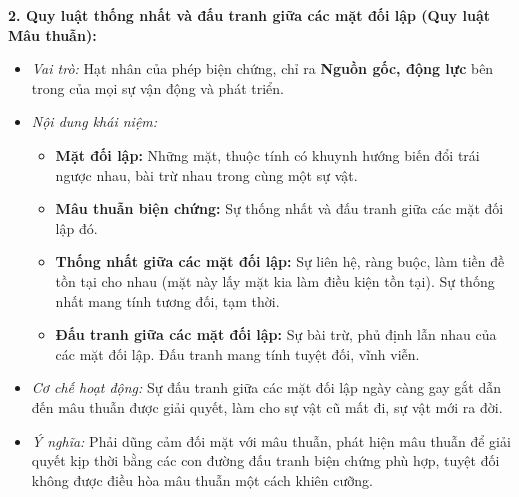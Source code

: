 \documentclass[12pt,a4paper]{article}
\begin{document}
{\noindent
\textbf{2. Quy luật thống nhất và đấu tranh giữa các mặt đối lập (Quy luật Mâu thuẫn):}
\begin{itemize}
    \item \textit{Vai trò:} Hạt nhân của phép biện chứng, chỉ ra \textbf{Nguồn gốc, động lực} bên trong của mọi sự vận động và phát triển.
    \item \textit{Nội dung khái niệm:}
    \begin{itemize}
        \item \textbf{Mặt đối lập:} Những mặt, thuộc tính có khuynh hướng biến đổi trái ngược nhau, bài trừ nhau trong cùng một sự vật.
        \item \textbf{Mâu thuẫn biện chứng:} Sự thống nhất và đấu tranh giữa các mặt đối lập đó.
        \item \textbf{Thống nhất giữa các mặt đối lập:} Sự liên hệ, ràng buộc, làm tiền đề tồn tại cho nhau (mặt này lấy mặt kia làm điều kiện tồn tại). Sự thống nhất mang tính tương đối, tạm thời.
        \item \textbf{Đấu tranh giữa các mặt đối lập:} Sự bài trừ, phủ định lẫn nhau của các mặt đối lập. Đấu tranh mang tính tuyệt đối, vĩnh viễn.
    \end{itemize}
    \item \textit{Cơ chế hoạt động:} Sự đấu tranh giữa các mặt đối lập ngày càng gay gắt dẫn đến mâu thuẫn được giải quyết, làm cho sự vật cũ mất đi, sự vật mới ra đời.
    \item \textit{Ý nghĩa:} Phải dũng cảm đối mặt với mâu thuẫn, phát hiện mâu thuẫn để giải quyết kịp thời bằng các con đường đấu tranh biện chứng phù hợp, tuyệt đối không được điều hòa mâu thuẫn một cách khiên cưỡng.
\end{itemize}

}
\end{document}
